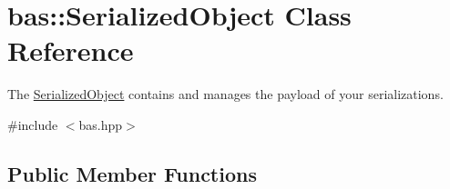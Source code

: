 \hypertarget{classbas_1_1SerializedObject}{}\section{bas\+::Serialized\+Object Class Reference}
\label{classbas_1_1SerializedObject}


The \mbox{\hyperlink{classbas_1_1SerializedObject}{Serialized\+Object}} contains and manages the payload of your serializations.  




{\ttfamily \#include $<$bas.\+hpp$>$}

\subsection*{Public Member Functions}
